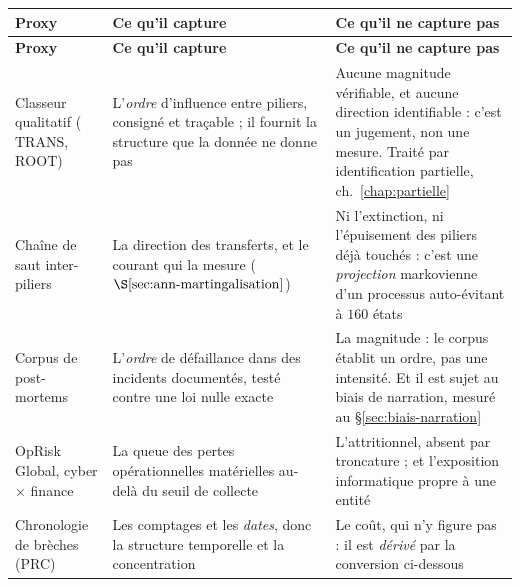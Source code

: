 \vspace{0.2cm}
{\footnotesize
\renewcommand{\arraystretch}{1.3}
\begin{longtable}{@{}>{\raggedright\arraybackslash}p{3.1cm}
                    >{\raggedright\arraybackslash}p{5.4cm}
                    >{\raggedright\arraybackslash}p{5.6cm}@{}}
\toprule
\textbf{Proxy} & \textbf{Ce qu'il capture} & \textbf{Ce qu'il ne capture pas} \\
\midrule
\endfirsthead
\toprule
\textbf{Proxy} & \textbf{Ce qu'il capture} & \textbf{Ce qu'il ne capture pas} \\
\midrule
\endhead
\bottomrule
\endlastfoot
Classeur qualitatif ($\mathrm{TRANS}$, $\mathrm{ROOT}$) &
L'\emph{ordre} d'influence entre piliers, consigné et traçable ; il fournit la structure que
la donnée ne donne pas &
Aucune magnitude vérifiable, et aucune direction identifiable : c'est un jugement, non une
mesure. Traité par identification partielle, ch.~\ref{chap:partielle} \\

Chaîne de saut inter-piliers &
La direction des transferts, et le courant qui la mesure ($\S\ref{sec:ann-martingalisation}$) &
Ni l'extinction, ni l'épuisement des piliers déjà touchés : c'est une \emph{projection}
markovienne d'un processus auto-évitant à $160$ états \\

Corpus de post-mortems &
L'\emph{ordre} de défaillance dans des incidents documentés, testé contre une loi nulle exacte &
La magnitude : le corpus établit un ordre, pas une intensité. Et il est sujet au biais de
narration, mesuré au \S\ref{sec:biais-narration} \\

OpRisk Global, cyber $\times$ finance &
La queue des pertes opérationnelles matérielles au-delà du seuil de collecte &
L'attritionnel, absent par troncature ; et l'exposition informatique propre à une entité \\

Chronologie de brèches (PRC) &
Les comptages et les \emph{dates}, donc la structure temporelle et la concentration &
Le coût, qui n'y figure pas : il est \emph{dérivé} par la conversion ci-dessous \\


\end{longtable}}
